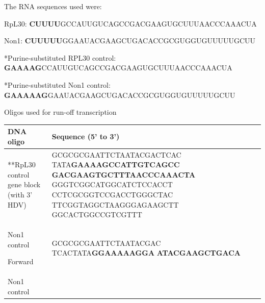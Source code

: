 \documentclass[12pt,oneside]{reedthesis}
\begin{document}
The RNA sequences used were:

RpL30: \textbf{CUUUU}GCCAUUGUCAGCCGACGAAGUGCUUUAACCCAAACUA

Non1: \textbf{CUUUUU}GGAAUACGAAGCUGACACCGCGUGGUGUUUUUGCUU

*Purine-substituted RPL30 control:
\textbf{GAAAAG}CCAUUGUCAGCCGACGAAGUGCUUUAACCCAAACUA

*Purine-substituted Non1 control:
\textbf{GAAAAAG}GAAUACGAAGCUGACACCGCGUGGUGUUUUUGCUU

Oligos used for run-off transcription
\begin{longtable}[]{@{}ll@{}}
\toprule
\begin{minipage}[b]{0.46\columnwidth}\raggedright
\textbf{DNA oligo}\strut
\end{minipage} & \begin{minipage}[b]{0.46\columnwidth}\raggedright
\textbf{Sequence (5' to 3')}\strut
\end{minipage}\tabularnewline
\midrule
\endhead
\begin{minipage}[t]{0.46\columnwidth}\raggedright
**RpL30 control gene block
(with 3' HDV)\strut
\end{minipage} & \begin{minipage}[t]{0.46\columnwidth}\raggedright
GCGCGCGAATTCTAATACGACTCAC
\textbar{} TATA\textbf{GAAAAGCCATTGTCAGCC}
\textbf{GACGAAGTGCTTTAACCCAAACTA}
GGGTCGGCATGGCATCTCCACCT
CCTCGCGGTCCGACCTGGGCTAC
TTCGGTAGGCTAAGGGAGAAGCTT
GGCACTGGCCGTCGTTT\strut
\end{minipage}\tabularnewline
\begin{minipage}[t]{0.46\columnwidth}\raggedright
Non1 control

Forward\strut
\end{minipage} & \begin{minipage}[t]{0.46\columnwidth}\raggedright
GCGCGCGAATTCTAATACGAC
TCACTATA\textbf{GGAAAAAGGA}
\textbf{ATACGAAGCTGACA}\strut
\end{minipage}\tabularnewline
\begin{minipage}[t]{0.46\columnwidth}\raggedright
Non1 control


\end{minipage}
\end{longtable}
\end{document}
